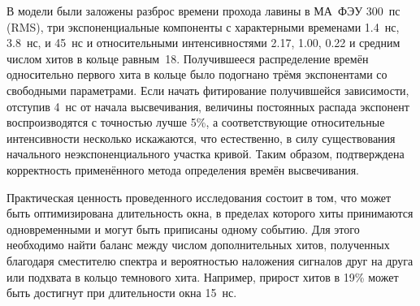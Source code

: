 В модели были заложены разброс времени прохода лавины в МА~ФЭУ 300~пс (RMS), три экспоненциальные компоненты с характерными временами 1.4~нс, 3.8~нс, и 45~нс и относительными интенсивностями 2.17, 1.00, 0.22 и средним числом хитов в кольце равным~18. Получившееся распределение времён односительно первого хита в кольце было подогнано трёмя экспонентами со свободными параметрами. Если начать фитирование получившейся зависимости, отступив 4~нс от начала высвечивания, величины постоянных распада экспонент воспроизводятся с точностью лучше 5\%, а соответствующие относительные интенсивности несколько искажаются, что естественно, в силу существования начального неэкспоненциального участка кривой. Таким образом, подтверждена корректность применённого метода определения времён высвечивания.

Практическая ценность проведенного исследования состоит в том, что может быть оптимизирована длительность окна, в пределах которого хиты принимаются одновременными и могут быть приписаны одному событию. Для этого необходимо найти баланс между числом дополнительных хитов, полученных благодаря сместителю спектра и вероятностью наложения сигналов друг на друга или подхвата в кольцо темнового хита. Например, прирост хитов в 19\% может быть достигнут при длительности окна 15~нс.



